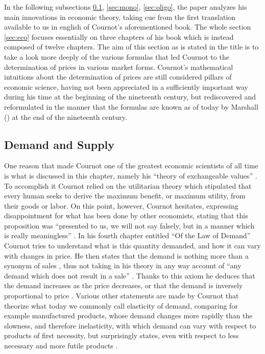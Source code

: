 \documentclass[12pt]{article}
\numberwithin{equation}{subsection}
\let\oldsubsection\subsection%
\renewcommand{\subsection}{%
  \renewcommand{\theequation}{\thesubsection.\arabic{equation}}%
  \oldsubsection}%
\begin{document}
In the following subsections \ref{sec:demand}, \ref{sec:mono}, \ref{sec:oligo}, the paper analyzes his main innovations in economic theory, taking cue from the first translation available to us in english \citep{cournot1897researches} of Cournot's aforementioned book. The whole section \ref{sec:eco} focuses essentially on three chapters of his book which is instead composed of twelve chapters. The aim of this section as is stated in the title is to take a look more deeply of the various formulas that led Cournot to the determination of prices in various market forms. Cournot's mathematical intuitions about the determination of prices are still considered pillars of economic science, having not been appreciated in a sufficiently important way during his time at the beginning of the nineteenth century, but rediscovered and reformulated in the manner that the formulas are known as of today by Marshall (\citeyear{marshall_principles_1988}) at the end of the nineteenth century.
\subsection{Demand and Supply}
\label{sec:demand}
One reason that made Cournot one of the greatest economic scientists of all time is what is discussed in this chapter, namely his ``theory of exchangeable values'' \cite[p. 44]{cournot1897researches}. To accomplish it Cournot relied on the utilitarian theory which stipulated that every human seeks to derive the maximum benefit, or maximum utility, from their goods or labor. On this point, however, Cournot hesitates, expressing disappointment for what has been done by other economists, stating that this proposition was ``presented to us, we will not say falsely, but in a manner which is really meaningless'' \cite[p. 44]{cournot1897researches}. In his fourth chapter entitled ``Of the Law of Demand'' \cite[p. 44]{cournot1897researches} Cournot tries to understand what is this quantity demanded, and how it can vary with changes in price. He then states that the demand is nothing more than a synonym of sales \cite[p. 46]{cournot1897researches}, thus not taking in his theory in any way account of ``any demand which does not result in a sale'' \cite[p. 46]{cournot1897researches}. Thanks to this axiom he deduces that the demand increases as the price decreases, or that the demand is inversely proportional to price \cite[p.46]{cournot1897researches}. Various other statements are made by Cournot that theorize what today we commonly call elasticity of demand, comparing for example manufactured products, whose demand changes more rapidly than the slowness, and therefore inelasticity, with which demand can vary with respect to products of first necessity, but surprisingly states, even with respect to less necessary and more futile products \cite[p. 46]{cournot1897researches}.
\end{document}
